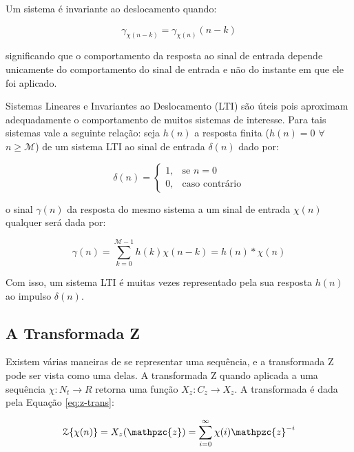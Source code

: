 {Um sistema é invariante ao deslocamento quando:

\begin{equation}
\gamma_{\chi(n-k)} = \gamma_{\chi(n)}(n - k)
\end{equation}

significando que o comportamento da resposta ao sinal de entrada depende unicamente
do comportamento do sinal de entrada e não do instante em que ele foi aplicado.

Sistemas Lineares e Invariantes ao Deslocamento (LTI) são úteis pois aproximam
adequadamente o comportamento de muitos sistemas de interesse. Para tais
sistemas vale a seguinte relação: seja $h(n)$ a resposta finita ($h(n) = 0$ $\forall$ $n \geq \mathcal{M}$) de um sistema  LTI ao sinal de entrada $\delta(n)$ dado por:

\begin{equation}
    \delta(n)= 
\begin{cases}
    1,& \text{se } n = 0\\
    0,              & \text{caso contrário}
\end{cases}
\end{equation}

o sinal $\gamma(n)$ da resposta do mesmo sistema a um sinal de entrada $\chi(n)$ qualquer
será dada por:

\begin{equation}
\gamma(n) = \sum_{k=0} ^{\mathcal{M}-1} h(k)\chi(n-k) = h(n) * \chi(n)
\end{equation}

Com isso, um sistema LTI é muitas vezes representado pela sua resposta $h(n)$ ao
impulso $\delta(n)$.



\subsection{A Transformada Z}

Existem várias maneiras de se representar uma sequência, e a transformada Z pode
ser vista como uma delas. A transformada Z quando aplicada a uma sequência
$\chi:N_t\rightarrow R$ retorna uma função $X_z:C_z\rightarrow X_z$. A transformada é dada
pela Equação \ref{eq:z-trans}:

\begin{equation}
\mathcal{Z} \{ \chi(n) \} = X_z(\mathpzc{z}) = \sum_{i=0}^{\infty} \chi(i)\mathpzc{z}^{-i}
\label{eq:z-trans}
\end{equation}


}
